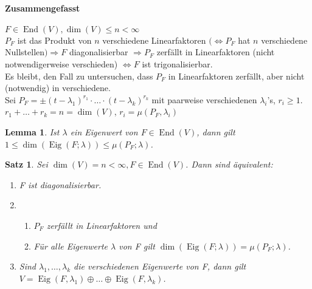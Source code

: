 \documentclass[12pt,a4paper]{article}
\theoremstyle{plain}
\newtheorem{Satz}[Theorem]{Satz}
\newtheorem{Lemma}[Theorem]{Lemma}
\numberwithin{equation}{section}
\begin{document}
\paragraph*{Zusammengefasst} $F\in \operatorname{End}(V), \dim(V)\leq n < \infty$ \\
$P_F$ ist das Produkt von $n$ verschiedene Linearfaktoren $(\Leftrightarrow P_F$ hat $n$ verschiedene Nullstellen$) \Rightarrow F$ diagonalisierbar $\Rightarrow P_F$ zerfällt in Linearfaktoren (nicht notwendigerweise verschieden) $\Leftrightarrow F$ ist trigonalisierbar. \\
Es bleibt, den Fall zu untersuchen, dass $P_F$ in Linearfaktoren zerfällt, aber nicht (notwendig) in verschiedene.\\
Sei $P_F=\pm (t-\lambda_1)^{r_1}\cdot \ldots \cdot(t-\lambda_k)^{r_k}$ mit paarweise verschiedenen $\lambda_i$'s, $r_i\geq 1$.\\
$r_1+\ldots+r_k=n=\dim(V)$, $r_i=\mu(P_F,\lambda_i)$
\begin{Lemma}
Ist $\lambda$ ein Eigenwert von $F\in\operatorname{End}(V)$, dann gilt $1\leq \dim(\operatorname{Eig}(F;\lambda))\leq \mu(P_F;\lambda)$.
\end{Lemma}
\begin{Satz}
Sei $\dim(V)=n<\infty, F\in \operatorname{End}(V)$. Dann sind äquivalent:
\begin{enumerate}
\renewcommand{\labelenumi}{\emph{\roman{enumi})}}
\item F ist diagonalisierbar.
\item \begin{enumerate}
\renewcommand{\labelenumii}{\emph{\alph{enumii})}}
\item $P_F$ zerfällt in Linearfaktoren und
\item Für alle Eigenwerte $\lambda$ von F gilt $\dim(\operatorname{Eig}(F;\lambda))=\mu(P_F;\lambda)$.
\end{enumerate}
\item Sind $\lambda_1, \ldots, \lambda_k$ die verschiedenen Eigenwerte von F, dann gilt $V=\operatorname{Eig}(F,\lambda_1)\oplus \ldots \oplus \operatorname{Eig}(F,\lambda_k)$.
\end{enumerate}
\end{Satz}
\end{document}
